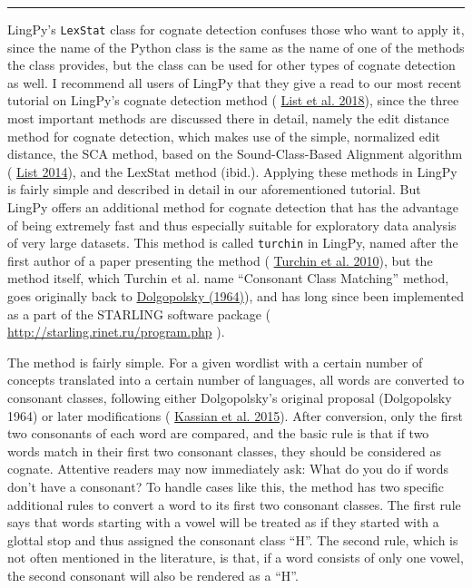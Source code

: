 \documentclass[
  a4paper,
  14pt,
  oneside,
  tablecaptionabove
]{scrbook}
\begin{document}
\begin{center}\rule{0.5\linewidth}{1pt}\end{center}

LingPy's \lstinline!LexStat! class for cognate detection confuses those
who want to apply it, since the name of the Python class is the same as
the name of one of the methods the class provides, but the class can be
used for other types of cognate detection as well. I recommend all users
of LingPy that they give a read to our most recent tutorial on LingPy's
cognate detection method (
\href{http://bibliography.lingpy.org?key=List2018d}{List et al. 2018}),
since the three most important methods are discussed there in detail,
namely the edit distance method for cognate detection, which makes use
of the simple, normalized edit distance, the SCA method, based on the
Sound-Class-Based Alignment algorithm (
\href{http://bibliography.lingpy.org?key=List2014d}{List 2014}), and
the LexStat method (ibid.). Applying these methods in LingPy is fairly
simple and described in detail in our aforementioned tutorial. But
LingPy offers an additional method for cognate detection that has the
advantage of being extremely fast and thus especially suitable for
exploratory data analysis of very large datasets. This method is called
\lstinline!turchin! in LingPy, named after the first author of a paper
presenting the method (
\href{http://bibliography.lingpy.org?key=Turchin2010}{Turchin et al.
2010}), but the method itself, which Turchin et al. name
\enquote{Consonant Class Matching} method, goes originally back to
\href{http://bibliography.lingpy.org?key=Dolgopolsky1964}{Dolgopolsky
(1964)}), and has long since been implemented as a part of the STARLING
software package (
\href{http://starling.rinet.ru/program.php?lan=en}{http://starling.rinet.ru/program.php}
). 

The method is fairly simple. For a given wordlist with a certain number
of concepts translated into a certain number of languages, all words are
converted to consonant classes, following either Dolgopolsky's original
proposal (Dolgopolsky 1964) or later modifications (
\href{http://bibliography.lingpy.org?key=Kassian2015b}{Kassian et al.
2015}). After conversion, only the first two consonants of each word
are compared, and the basic rule is that if two words match in their
first two consonant classes, they should be considered as cognate.
Attentive readers may now immediately ask: What do you do if words don't
have a consonant? To handle cases like this, the method has two specific
additional rules to convert a word to its first two consonant classes.
The first rule says that words starting with a vowel will be treated as
if they started with a glottal stop and thus assigned the consonant
class \enquote{H}. The second rule, which is not often mentioned in the
literature, is that, if a word consists of only one vowel, the second
consonant will also be rendered as a \enquote{H}.
\end{document}
